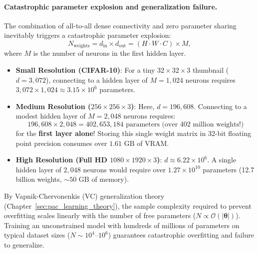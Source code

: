 \paragraph{Catastrophic parameter explosion and generalization failure.}
The combination of all-to-all dense connectivity and zero parameter sharing inevitably triggers a catastrophic parameter explosion:
\begin{equation}
N_{\text{weights}} = d_{\text{in}} \times d_{\text{out}} = (H \cdot W \cdot C) \times M,
\end{equation}
where $M$ is the number of neurons in the first hidden layer.
\begin{itemize}[noitemsep]
  \item \textbf{Small Resolution (CIFAR-10)}: For a tiny $32 \times 32 \times 3$ thumbnail ($d = 3,072$), connecting to a hidden layer of $M = 1,024$ neurons requires $3,072 \times 1,024 \approx 3.15 \times 10^6$ parameters.
  \item \textbf{Medium Resolution ($256 \times 256 \times 3$)}: Here, $d = 196,608$. Connecting to a modest hidden layer of $M = 2,048$ neurons requires:
    \begin{equation}
    196,608 \times 2,048 = 402,653,184 \text{ parameters (over } 402 \text{ million weights!)}
    \end{equation}
    for the \textbf{first layer alone}! Storing this single weight matrix in 32-bit floating point precision consumes over $1.61\text{ GB}$ of VRAM.
  \item \textbf{High Resolution (Full HD $1080 \times 1920 \times 3$)}: $d \approx 6.22 \times 10^6$. A single hidden layer of $2,048$ neurons would require over $1.27 \times 10^{10}$ parameters (12.7 billion weights, $\sim 50\text{ GB}$ of memory).
\end{itemize}
By Vapnik-Chervonenkis (VC) generalization theory (Chapter~\ref{sec:pac_learning_theory}), the sample complexity required to prevent overfitting scales linearly with the number of free parameters ($N \propto \mathcal{O}(|\boldsymbol{\theta}|)$). Training an unconstrained model with hundreds of millions of parameters on typical dataset sizes ($N \sim 10^4$--$10^6$) guarantees catastrophic overfitting and failure to generalize.


